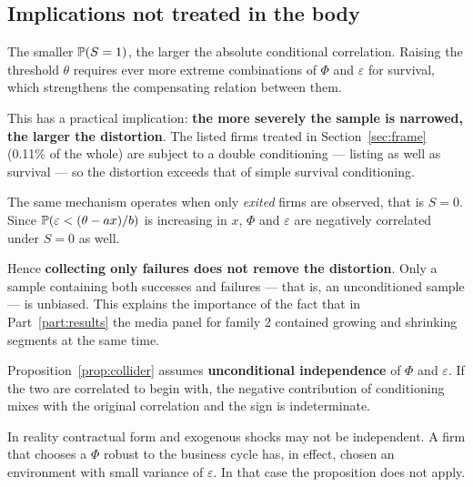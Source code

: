 \subsection{Implications not treated in the body}

\begin{remark}
\label{rem:collider-strength}
The smaller $\mathbb{P}(S=1)$, the larger the absolute conditional correlation. Raising the threshold
$\theta$ requires ever more extreme combinations of $\Phi$ and $\varepsilon$ for survival, which
strengthens the compensating relation between them.

This has a practical implication: \textbf{the more severely the sample is narrowed, the larger
the distortion}. The listed firms treated in Section~\ref{sec:frame} (0.11\% of the whole) are
subject to a double conditioning — listing as well as survival — so the distortion exceeds that
of simple survival conditioning.
\end{remark}

\begin{remark}
\label{rem:collider-reverse}
The same mechanism operates when only \emph{exited} firms are observed, that is $S=0$. Since
$\mathbb{P}(\varepsilon<(\theta-ax)/b)$ is increasing in $x$, $\Phi$ and $\varepsilon$ are negatively
correlated under $S=0$ as well.

Hence \textbf{collecting only failures does not remove the distortion}. Only a sample containing
both successes and failures — that is, an unconditioned sample — is unbiased. This explains the
importance of the fact that in Part~\ref{part:results} the media panel for family 2 contained
growing and shrinking segments at the same time.
\end{remark}

\begin{remark}
\label{rem:collider-limit}
Proposition~\ref{prop:collider} assumes \textbf{unconditional independence} of $\Phi$ and
$\varepsilon$. If the two are correlated to begin with, the negative contribution of conditioning
mixes with the original correlation and the sign is indeterminate.

In reality contractual form and exogenous shocks may not be independent. A firm that chooses a
$\Phi$ robust to the business cycle has, in effect, chosen an environment with small variance of
$\varepsilon$. In that case the proposition does not apply.
\end{remark}

